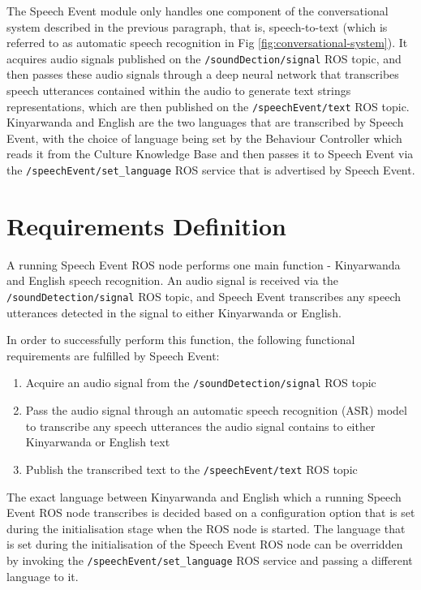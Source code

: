 \documentclass{CSSRforAfrica}
\begin{document}
The Speech Event module only handles one component of the conversational system described in the previous paragraph, that is, speech-to-text (which is referred to as automatic speech recognition in Fig \ref{fig:conversational-system}). It acquires audio signals published on the \texttt{/soundDection/signal} ROS topic, and then passes these audio signals through a deep neural network that transcribes speech utterances contained within the audio to generate text strings representations, which are then published on the \texttt{/speechEvent/text} ROS topic. Kinyarwanda and English are the two languages that are transcribed by Speech Event, with the choice of language being set by the Behaviour Controller which reads it from the Culture Knowledge Base and then passes it to Speech Event via the \texttt{/speechEvent/set\_language} ROS service that is advertised by Speech Event.


\newpage
\section{Requirements Definition}
A running Speech Event ROS node performs one main function - Kinyarwanda and English speech recognition. An audio signal is received via the \texttt{/soundDetection/signal} ROS topic, and Speech Event transcribes any speech utterances detected in the signal to either Kinyarwanda or English.

In order to successfully perform this function, the following functional requirements are fulfilled by Speech Event:

\begin{enumerate}
    \item Acquire an audio signal from the \texttt{/soundDetection/signal} ROS topic
    \item Pass the audio signal through an automatic speech recognition (ASR) model to transcribe any speech utterances the audio signal contains to either Kinyarwanda or English text
    \item Publish the transcribed text to the \texttt{/speechEvent/text} ROS topic
\end{enumerate}

The exact language between Kinyarwanda and English which a running Speech Event ROS node transcribes is decided based on a configuration option that is set during the initialisation stage when the ROS node is started. The language that is set during the initialisation of the Speech Event ROS node can be overridden by invoking the \texttt{/speechEvent/set\_language} ROS service and passing a different language to it.
\end{document}
